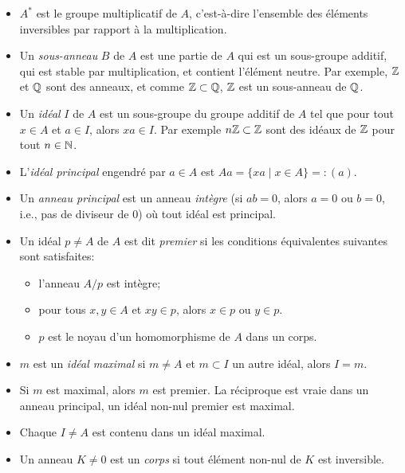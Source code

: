 \begin{itemize}
\item $A^\ast$ est le groupe multiplicatif de $A$, c'est-à-dire l'ensemble des éléments inversibles par
  rapport à la multiplication.

\item Un \emph{sous-anneau} $B$ de $A$ est une partie de $A$ qui est un sous-groupe additif, qui est stable
  par multiplication, et contient l'élément neutre. Par exemple, $\mathbb{Z}$ et $\mathbb{Q}$ sont des anneaux, et comme $\mathbb{Z}
  \subset \mathbb{Q}$, $\mathbb{Z}$ est un sous-anneau de $\mathbb{Q}$.

\item Un \emph{idéal} $I$ de $A$ est un sous-groupe du groupe additif de $A$ tel que pour tout $x \in A$ et $a
  \in I$, alors $xa \in I$. Par exemple $n\mathbb{Z} \subset \mathbb{Z}$ sont des idéaux de $\mathbb{Z}$ pour tout $n \in \mathbb{N}$.

\item L'\emph{idéal principal} engendré par $a \in A$ est $Aa = \{xa \mid x \in A\} =: (a)$.

\item Un \emph{anneau principal} est un anneau \emph{intègre} (si $ab = 0$, alors $a = 0$ ou $b = 0$, i.e.,
  pas de diviseur de $0$) où tout idéal est principal.

\item Un idéal $p \neq A$ de $A$ est dit \emph{premier} si les conditions équivalentes suivantes sont satisfaites:
  \begin{itemize}
  \item l'anneau $A/p$ est intègre;
  \item pour tous $x, y \in A$ et $xy \in p$, alors $x \in p$ ou $y \in p$.
  \item $p$ est le noyau d'un homomorphisme de $A$ dans un corps.
  \end{itemize}

\item $m$ est un \emph{idéal maximal} si $m \neq A$ et $m \subset I$ un autre idéal, alors $I = m$.

\item Si $m$ est maximal, alors $m$ est premier. La réciproque est vraie dans un anneau principal, un idéal
  non-nul premier est maximal.

\item Chaque $I \neq A$ est contenu dans un idéal maximal.

\item Un anneau $K \neq 0$ est un \emph{corps} si tout élément non-nul de $K$ est inversible.


\end{itemize}
